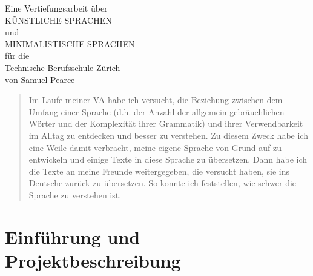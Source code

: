 \documentclass{article}
\begin{document}
\graphicspath{ {../images/} }

%

\begingroup
\centering
\vfill
\Large{Eine Vertiefungsarbeit über}\\
\Huge{KÜNSTLICHE SPRACHEN}\\
\huge{und}\\
\huge{MINIMALISTISCHE SPRACHEN}\\
\large{für die}\\
\Large{Technische Berufsschule Zürich}\\
\vspace{3cm}
\Large{von Samuel Pearce}\\
\vfill\null
\endgroup
\thispagestyle{empty}

%
% 

\begin{abstract}
    Im Laufe meiner VA habe ich versucht, die Beziehung zwischen dem Umfang einer Sprache
    (d.h. der Anzahl der allgemein gebräuchlichen Wörter und der Komplexität ihrer Grammatik)
    und ihrer Verwendbarkeit im Alltag zu entdecken und besser zu verstehen.
    Zu diesem Zweck habe ich eine Weile damit verbracht, meine eigene Sprache von Grund auf zu
    entwickeln und einige Texte in diese Sprache zu übersetzen. Dann habe ich die Texte an meine
    Freunde weitergegeben, die versucht haben, sie ins Deutsche zurück zu übersetzen.
    So konnte ich feststellen, wie schwer die Sprache zu verstehen ist.
\end{abstract}
\pagebreak

\tableofcontents
\pagebreak




\section{Einführung und Projektbeschreibung}
\end{document}
